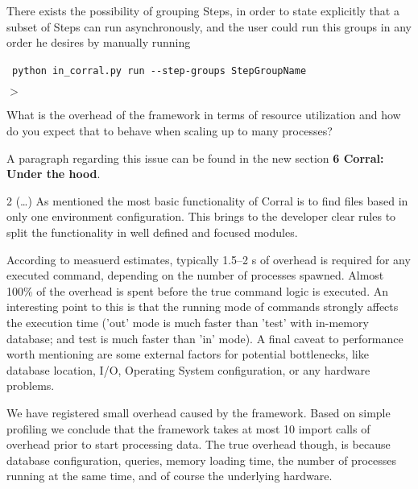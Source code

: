 \documentclass[a4paper,onecolumn,fleqn,usenatbib,useAMS]{mnrasr}
\newenvironment{frshaded}{%
\def\FrameCommand{\fboxrule=\FrameRule\fboxsep=\FrameSep \fcolorbox{framecolor}{shadecolor}}%
\MakeFramed {\FrameRestore}}%
{\endMakeFramed}
\newenvironment{myindentpar}[1]%
 {\begin{list}{}%
         \bigskip
         \color{refereecolor}
         {\setlength{\leftmargin}{#1}}%
         \itshape
         \item[$>$]%
 }
 {\end{list}}
\begin{document}
There exists the possibility of grouping Steps, in order to state explicitly that
a subset of Steps can run asynchronously, and the user could run this groups in
any order he desires by manually running 

~\verb|python in_corral.py run --step-groups StepGroupName|


\begin{myindentpar}{1cm}
What is the overhead of the framework in terms of resource
utilization and how do you expect that to behave when scaling up to
many processes? 
\end{myindentpar}

%
A paragraph regarding this issue can be found in the new section 
\textbf{6 Corral: Under the hood}.

\begin{frshaded}
\begin{multicols}{2}
(\ldots)
As mentioned the most basic functionality of Corral is to find files 
based in only one environment configuration. 
%
This brings to the developer clear rules to split the functionality 
in well defined and focused modules.

According to measuerd estimates, typically 1.5--2 s of overhead is required for any
executed command, depending on the number of processes spawned. 
%
Almost 100\% of the overhead is spent before the true command logic is executed.
%
An interesting point to this is that the running mode of commands strongly affects
the execution time ('out' mode is much faster than 'test' with
in-memory database; and test is much faster than 'in' mode).
%
A final caveat to performance worth mentioning are some external 
factors for potential bottlenecks, like database location, I/O, 
Operating System configuration, or any hardware problems.
\end{multicols}
\end{frshaded}

We have registered small overhead caused by the framework. 
Based on simple profiling we conclude that the framework takes
at most 10 import calls of overhead prior to start processing
data. 
%
The true overhead though, is because database configuration, queries, 
memory loading time, the number of processes running at the same time, 
and of course the underlying hardware.
\end{document}

